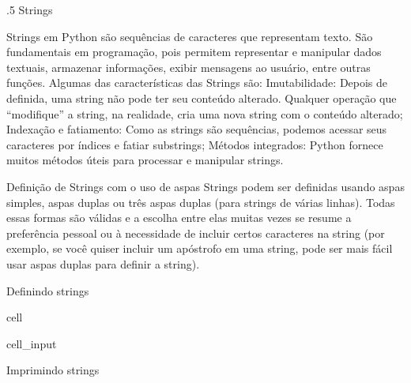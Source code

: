 \documentclass[letterpaper,10pt,english]{jupyterBook}
\begin{document}
.5 Strings

\sphinxAtStartPar
Strings em Python são sequências de caracteres que representam texto. São fundamentais em programação, pois permitem representar e manipular dados textuais, armazenar informações, exibir mensagens ao usuário, entre outras funções. Algumas das características das Strings são:
Imutabilidade: Depois de definida, uma string não pode ter seu conteúdo alterado. Qualquer operação que “modifique” a string, na realidade, cria uma nova string com o conteúdo alterado;
Indexação e fatiamento: Como as strings são sequências, podemos acessar seus caracteres por índices e fatiar sub\sphinxhyphen{}strings;
Métodos integrados: Python fornece muitos métodos úteis para processar e manipular strings.

\sphinxAtStartPar
Definição de Strings com o uso de aspas
Strings podem ser definidas usando aspas simples, aspas duplas ou três aspas duplas (para strings de várias linhas). Todas essas formas são válidas e a escolha entre elas muitas vezes se resume a preferência pessoal ou à necessidade de incluir certos caracteres na string (por exemplo, se você quiser incluir um apóstrofo em uma string, pode ser mais fácil usar aspas duplas para definir a string).

\sphinxAtStartPar
Definindo strings

\begin{sphinxuseclass}{cell}\begin{sphinxVerbatimInput}

\begin{sphinxuseclass}{cell_input}
\begin{sphinxVerbatim}[commandchars=\\\{\}]
  
  
  
\end{sphinxVerbatim}

\end{sphinxuseclass}\end{sphinxVerbatimInput}

\end{sphinxuseclass}
\sphinxAtStartPar
Imprimindo strings
\end{document}
